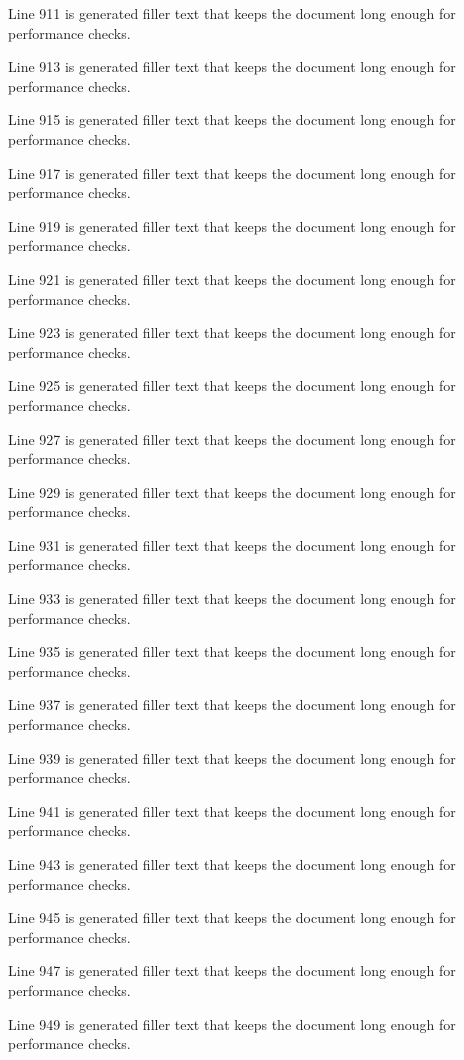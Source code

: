 Line 911 is generated filler text that keeps the document long enough for performance checks.

Line 913 is generated filler text that keeps the document long enough for performance checks.

Line 915 is generated filler text that keeps the document long enough for performance checks.

Line 917 is generated filler text that keeps the document long enough for performance checks.

Line 919 is generated filler text that keeps the document long enough for performance checks.

Line 921 is generated filler text that keeps the document long enough for performance checks.

Line 923 is generated filler text that keeps the document long enough for performance checks.

Line 925 is generated filler text that keeps the document long enough for performance checks.

Line 927 is generated filler text that keeps the document long enough for performance checks.

Line 929 is generated filler text that keeps the document long enough for performance checks.

Line 931 is generated filler text that keeps the document long enough for performance checks.

Line 933 is generated filler text that keeps the document long enough for performance checks.

Line 935 is generated filler text that keeps the document long enough for performance checks.

Line 937 is generated filler text that keeps the document long enough for performance checks.

Line 939 is generated filler text that keeps the document long enough for performance checks.

Line 941 is generated filler text that keeps the document long enough for performance checks.

Line 943 is generated filler text that keeps the document long enough for performance checks.

Line 945 is generated filler text that keeps the document long enough for performance checks.

Line 947 is generated filler text that keeps the document long enough for performance checks.

Line 949 is generated filler text that keeps the document long enough for performance checks.

